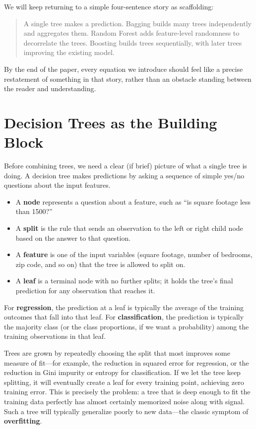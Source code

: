 \documentclass[12pt,a4paper]{article}
\begin{document}
We will keep returning to a simple four-sentence story as scaffolding:

\begin{quote}
A single tree makes a prediction. Bagging builds many trees independently and aggregates them. Random Forest adds feature-level randomness to decorrelate the trees. Boosting builds trees sequentially, with later trees improving the existing model.
\end{quote}

By the end of the paper, every equation we introduce should feel like a precise restatement of something in that story, rather than an obstacle standing between the reader and understanding.

\section{Decision Trees as the Building Block}

Before combining trees, we need a clear (if brief) picture of what a single tree is doing. A decision tree makes predictions by asking a sequence of simple yes/no questions about the input features.

\begin{itemize}[nosep]
    \item A \textbf{node} represents a question about a feature, such as ``is square footage less than 1500?''
    \item A \textbf{split} is the rule that sends an observation to the left or right child node based on the answer to that question.
    \item A \textbf{feature} is one of the input variables (square footage, number of bedrooms, zip code, and so on) that the tree is allowed to split on.
    \item A \textbf{leaf} is a terminal node with no further splits; it holds the tree's final prediction for any observation that reaches it.
\end{itemize}

For \textbf{regression}, the prediction at a leaf is typically the average of the training outcomes that fall into that leaf. For \textbf{classification}, the prediction is typically the majority class (or the class proportions, if we want a probability) among the training observations in that leaf.

Trees are grown by repeatedly choosing the split that most improves some measure of fit---for example, the reduction in squared error for regression, or the reduction in Gini impurity or entropy for classification. If we let the tree keep splitting, it will eventually create a leaf for every training point, achieving zero training error. This is precisely the problem: a tree that is deep enough to fit the training data perfectly has almost certainly memorized noise along with signal. Such a tree will typically generalize poorly to new data---the classic symptom of \textbf{overfitting}.
\end{document}

